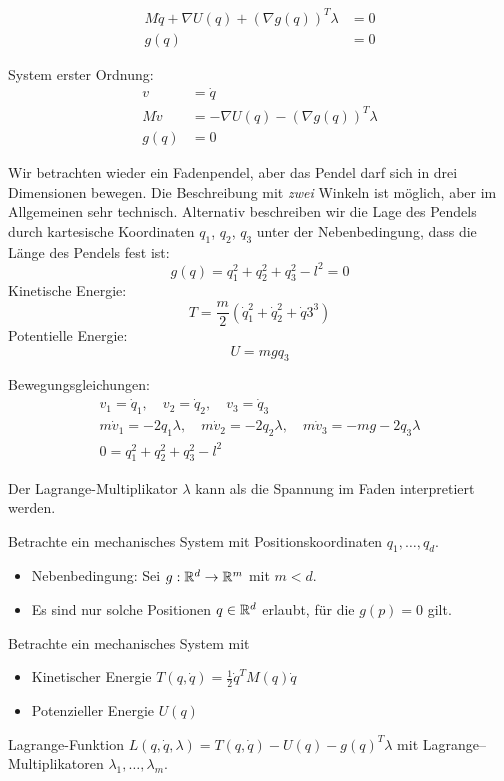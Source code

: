 \begin{align*}
	M \ddot q + \nabla U(q) + (\nabla g(q))^T \lambda & = 0 \\
	g(q) & = 0
\end{align*}

System erster Ordnung:
\begin{align*}
	v & = \dot q \\
	M \dot v & = - \nabla U(q) - (\nabla g(q))^T \lambda \\
	g(q) & = 0
\end{align*}


\begin{bsp}[Kugelpendel]
	Wir betrachten wieder ein Fadenpendel, aber das Pendel darf sich in drei Dimensionen bewegen. 
	Die Beschreibung mit \textit{zwei} Winkeln ist möglich, aber im Allgemeinen sehr technisch. Alternativ beschreiben wir die Lage des Pendels durch kartesische Koordinaten $q_1$, $q_2$, $q_3$ unter der Nebenbedingung, dass die Länge des Pendels fest ist:
	\begin{equation*}
		g(q) = q_1^2 + q_2^2 + q_3^2 - l^2 = 0
	\end{equation*}
	Kinetische Energie:
	\begin{equation*}
		T = \frac m2 (\dot q_1^2 + \dot q_2^2 + \dot q 3^3)
	\end{equation*}
	Potentielle Energie:
	\begin{equation*}
		U = m g q_3
	\end{equation*}
\end{bsp}


Bewegungsgleichungen:
\begin{align*}
	v_1 = \dot q_1, \quad
	v_2 = \dot q_2, \quad
	v_3 = \dot q_3
	\\
	m \dot v_1 = -2 q_1 \lambda, \quad
	m \dot v_2 = -2 q_2 \lambda, \quad
	m \dot v_3 = - m g - 2 q_3 \lambda
	\\
	0 = q_1^2 + q_2^2 + q_3^2 - l^2
\end{align*}

Der Lagrange-Multiplikator $\lambda$ kann als die Spannung im Faden interpretiert werden.

Betrachte ein mechanisches System mit Positionskoordinaten $q_1, \dots , q_d$.
\begin{itemize}
	\item Nebenbedingung: Sei $g: \mathbb R^d \rightarrow \mathbb R^m$ mit $m < d$.
	\item Es sind nur solche Positionen $q \in \mathbb R^d$ erlaubt, für die $g(p) = 0$ gilt.
\end{itemize}
Betrachte ein mechanisches System mit
\begin{itemize}
	\item Kinetischer Energie $T(q,\dot{q}) = \frac{1}{2} \dot{q}^T M(q) \dot{q}$
	\item Potenzieller Energie $U(q)$
\end{itemize}
Lagrange-Funktion $L(q, \dot{q}, \lambda) = T (q, \dot{q}) - U(q) - g(q)^T \lambda $ mit Lagrange--Multiplikatoren $\lambda_1, \dots , \lambda_m$.

